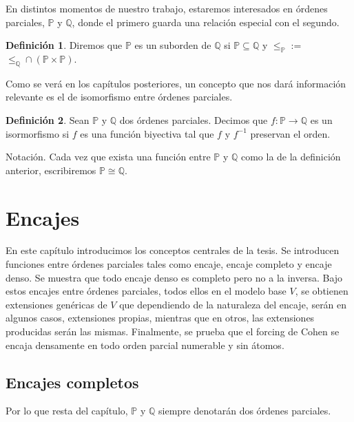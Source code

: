 \documentclass[11pt]{unam_tesis1}
\theoremstyle{MyThmStyle}
\theoremstyle{definition}
\newtheorem{definition}{Definici\'on}[chapter]
\theoremstyle{plain}
\theoremstyle{remark}
\let\leq\leqslant
\begin{document}
En distintos momentos de nuestro trabajo, estaremos interesados en \'ordenes parciales, $\mathbb P$ y $\mathbb Q$, donde el primero guarda una relaci\'on especial con el segundo.

\begin{definition}\label{suborden}
Diremos que $\mathbb P$ es un suborden de $\mathbb Q$ si $\mathbb P\subseteq \mathbb Q$ y $\leq_{\mathbb P}:=$ $\leq_{\mathbb Q}\cap (\mathbb P\times \mathbb P)$.
\end{definition}

Como se ver\'a en los cap\'itulos posteriores, un concepto que nos dar\'a informaci\'on relevante es el de isomorfismo entre \'ordenes parciales.

\begin{definition}
Sean $\mathbb P$ y $\mathbb Q$ dos \'ordenes parciales. Decimos que $f:\mathbb P\to \mathbb Q$ es un isormorfismo si $f$ es una funci\'on biyectiva tal que $f$ y $f^{-1}$ preservan el orden.
\end{definition}

Notaci\'on. Cada vez que exista una funci\'on entre $\mathbb P$ y $\mathbb Q$ como la de la definici\'on anterior, escribiremos $\mathbb P\cong \mathbb Q$.



\chapter{Encajes}

En este cap\'itulo introducimos los conceptos centrales de la tesis. Se introducen funciones entre \'ordenes parciales tales como  encaje, encaje completo y encaje denso. Se muestra que todo encaje denso es completo pero no a la inversa. Bajo estos encajes entre \'ordenes parciales, todos ellos en el modelo base $V$, se obtienen  extensiones gen\'ericas de $V$ que dependiendo de la naturaleza del encaje, ser\'an en algunos casos, extensiones propias, mientras que en otros, las extensiones producidas ser\'an las mismas. Finalmente, se prueba que el forcing de Cohen se encaja densamente en todo orden parcial numerable y sin \'atomos.


\section{Encajes completos}

Por lo que resta del cap\'itulo, $\mathbb P$ y $\mathbb Q$ siempre denotar\'an dos \'ordenes parciales.
\end{document}

